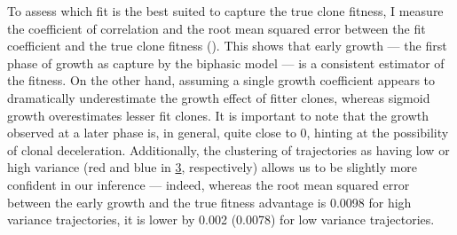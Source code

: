 \begin{figure}[h]
	\label{fig:models-bnpr-example}
\end{figure}

\begin{figure}[h]
	\label{fig:all-simulated-bnpr}
\end{figure}

To assess which fit is the best suited to capture the true clone fitness, I measure the coefficient of correlation and the root mean squared error between the fit coefficient and the true clone fitness (). This shows that early growth --- the first phase of growth as capture by the biphasic model --- is a consistent estimator of the fitness. On the other hand, assuming a single growth coefficient appears to dramatically underestimate the growth effect of fitter clones, whereas sigmoid growth overestimates lesser fit clones. It is important to note that the growth observed at a later phase is, in general, quite close to 0, hinting at the possibility of clonal deceleration. Additionally, the clustering of trajectories as having low or high variance (red and blue in \ref{fig:benchmark-bnpr-fits}, respectively) allows us to be slightly more confident in our inference --- indeed, whereas the root mean squared error between the early growth and the true fitness advantage is 0.0098 for high variance trajectories, it is lower by 0.002 (0.0078) for low variance trajectories. 

\begin{figure}[h]
	\label{fig:benchmark-bnpr-fits}
\end{figure}

